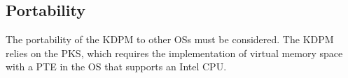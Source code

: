 
\subsection{Portability}
The portability of the KDPM to other OSs must be considered. The KDPM relies on
the PKS, which requires the implementation of virtual memory space with a PTE in
the OS that supports an Intel CPU.
%




